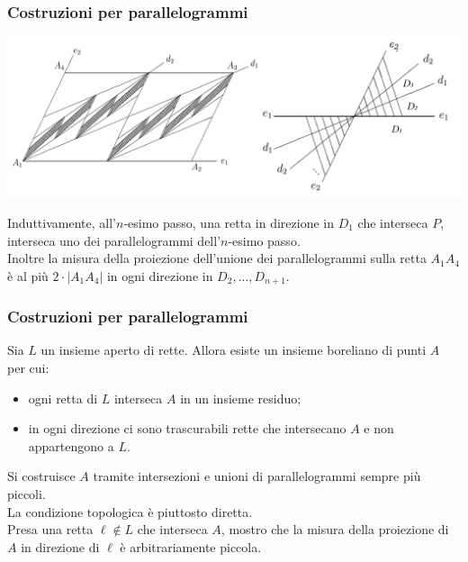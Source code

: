 \documentclass[11pt]{beamer} %
\newcommand{\<}{\langle}
\renewcommand{\>}{\rangle}
\theoremstyle{theorem}
\theoremstyle{theorem}
\theoremstyle{theorem}
\theoremstyle{theorem}
\theoremstyle{theorem}
\begin{document}
\begin{frame}[fragile]
	\frametitle{Costruzioni per parallelogrammi}
	
	\begin{center}
	\includegraphics[width=0.9\columnwidth]{prova2.png}
	\end{center}

	Induttivamente, all'$n$-esimo passo, una retta in direzione in $D_1$ che interseca $P$, interseca uno dei parallelogrammi dell'$n$-esimo passo.\\
	Inoltre la misura della proiezione dell'unione dei parallelogrammi 
	sulla retta $A_{1} A_{4}$ è al più $2 \cdot\left|A_{1} A_{4}\right|$ in ogni direzione in $D_2,...,D_{n+1}$.\\

\end{frame}



\begin{frame}
	\frametitle{Costruzioni per parallelogrammi}
	\begin{lemma}[2]
		Sia $L$ un insieme aperto di rette. Allora esiste un insieme boreliano di punti $A$ per cui:\\
		\begin{itemize}
			\item ogni retta di $L$ interseca $A$ in un insieme residuo;\\
			\item in ogni direzione ci sono trascurabili rette che intersecano $A$ e non appartengono a $L$.\\
		\end{itemize}
	\end{lemma}
	
	\pause
	Si costruisce $A$ tramite intersezioni e unioni di parallelogrammi sempre più piccoli.\\ \pause
	La condizione topologica è piuttosto diretta.\\ \pause
	Presa una retta $\ell \not \in L$ che interseca $A$, mostro che la misura della proiezione di $A$ in direzione di $\ell$ è arbitrariamente piccola.
	
	
\end{frame}	
\end{document}
